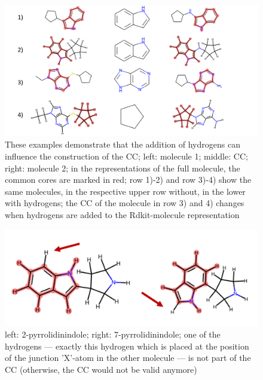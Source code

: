 \begin{figure}
	
	\includegraphics[scale=0.13]{hydrogens_plus_minus_v2.png}
	\caption{These examples demonstrate that the addition of hydrogens can influence the construction of the CC; left: molecule 1; middle: CC; right: molecule 2; in the representations of the full molecule, the common cores are marked in red; row 1)-2) and row 3)-4) show the same molecules, in the respective upper row without,
		in the lower with hydrogens; the CC of the molecule in row 3) and 4)  changes when hydrogens are added to the Rdkit-molecule
		representation}
		\label{fig:hydrogen_effect}
\end{figure}



\begin{figure}
	\includegraphics[scale=1.0]{pyrrolidinindole_v2}
	
	\caption{
		left: 2-pyrrolidinindole; right: 7-pyrrolidinindole; 
		one of the hydrogens --- exactly this hydrogen which is placed at the position of the junction 'X'-atom in the other molecule --- is not part of the CC (otherwise, the CC would not be valid anymore)}
	\label{fig:pyrrolidinindole}
\end{figure}


